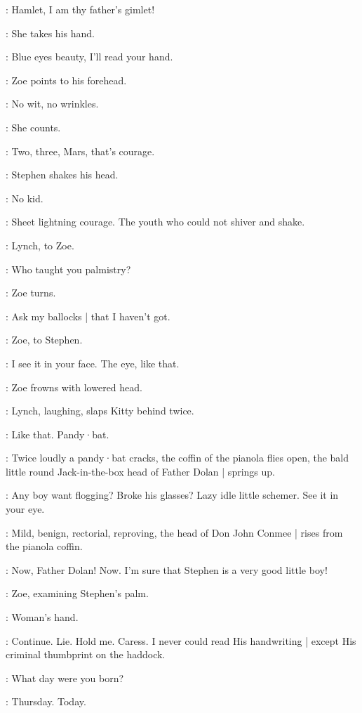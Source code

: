 \Zoe:
Hamlet,
I am thy father's gimlet!

:
She takes his hand.

\Zoe:
Blue eyes beauty,
I'll read your hand.

:
Zoe points to his forehead.

\Zoe:
No wit,
no wrinkles.

:
She counts.

\Zoe:
Two,
three,
Mars,
that's courage.

:
Stephen shakes his head.

\Zoe:
No kid.

\Lynch:
Sheet lightning courage.
The youth who could not shiver and shake.

:
Lynch, to Zoe.

\Lynch:
Who taught you palmistry?

:
Zoe turns.

\Zoe:
Ask my ballocks |
that I haven't got.

:
Zoe,
to Stephen.

\Zoe:
I see it in your face.
The eye,
like that.

:
Zoe frowns with lowered head.

:
Lynch,
laughing,
slaps Kitty behind twice.

\Lynch:
Like that.
Pandy·bat.

:
Twice loudly a pandy·bat cracks,
the coffin of the pianola flies open,
the bald little round Jack-in-the-box head of Father Dolan |
springs up.

\FatherDolan:
Any boy want flogging?
Broke his glasses?
Lazy idle little schemer.
See it in your eye.

:
Mild,
benign,
rectorial,
reproving,
the head of Don John Conmee |
rises from the pianola coffin.

\DonJohnConmee:
Now,
Father Dolan!
Now.
I'm sure that Stephen is a very good little boy!

:
Zoe,
examining Stephen's palm.

\Zoe:
Woman's hand.

\Stephen:
Continue.
Lie.
Hold me.
Caress.
I never could read His handwriting |
except His criminal thumbprint on the haddock.

\Zoe:
What day were you born?

\Stephen:
Thursday.
Today.

